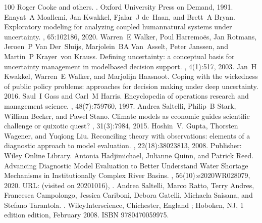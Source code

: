 \documentclass[letterpaper,10pt,english]{sphinxmanual}
\begin{document}
\begin{sphinxthebibliography}{100}
\sphinxAtStartPar
Roger Cooke and others. . Oxford University Press on Demand, 1991.
\sphinxAtStartPar
Enayat A Moallemi, Jan Kwakkel, Fjalar J de Haan, and Brett A Bryan. Exploratory modeling for analyzing coupled human\sphinxhyphen{}natural systems under uncertainty. , 65:102186, 2020.
\sphinxAtStartPar
Warren E Walker, Poul Harremoës, Jan Rotmans, Jeroen P Van Der Sluijs, Marjolein BA Van Asselt, Peter Janssen, and Martin P Krayer von Krauss. Defining uncertainty: a conceptual basis for uncertainty management in model\sphinxhyphen{}based decision support. , 4(1):5\textendash{}17, 2003.
\sphinxAtStartPar
Jan H Kwakkel, Warren E Walker, and Marjolijn Haasnoot. Coping with the wickedness of public policy problems: approaches for decision making under deep uncertainty. 2016.
\sphinxAtStartPar
Saul I Gass and Carl M Harris. Encyclopedia of operations research and management science. , 48(7):759\textendash{}760, 1997.
\sphinxAtStartPar
Andrea Saltelli, Philip B Stark, William Becker, and Pawel Stano. Climate models as economic guides scientific challenge or quixotic quest? , 31(3):79\textendash{}84, 2015.
\sphinxAtStartPar
Hoshin V. Gupta, Thorsten Wagener, and Yuqiong Liu. Reconciling theory with observations: elements of a diagnostic approach to model evaluation. , 22(18):3802\textendash{}3813, 2008. Publisher: Wiley Online Library.
\sphinxAtStartPar
Antonia Hadjimichael, Julianne Quinn, and Patrick Reed. Advancing Diagnostic Model Evaluation to Better Understand Water Shortage Mechanisms in Institutionally Complex River Basins. , 56(10):e2020WR028079, 2020. URL:  (visited on 2020\sphinxhyphen{}10\sphinxhyphen{}16), .
\sphinxAtStartPar
Andrea Saltelli, Marco Ratto, Terry Andres, Francesca Campolongo, Jessica Cariboni, Debora Gatelli, Michaela Saisana, and Stefano Tarantola. . Wiley\sphinxhyphen{}Interscience, Chichester, England ; Hoboken, NJ, 1 edition edition, February 2008. ISBN 978\sphinxhyphen{}0\sphinxhyphen{}470\sphinxhyphen{}05997\sphinxhyphen{}5.

\end{sphinxthebibliography}
\end{document}
